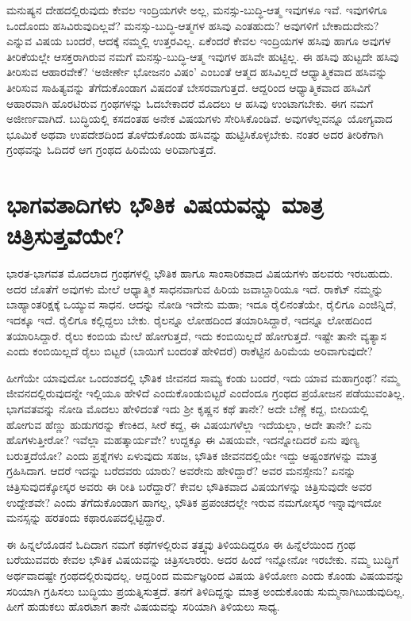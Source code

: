 ಮನುಷ್ಯನ ದೇಹದಲ್ಲಿರುವುದು ಕೇವಲ ಇಂದ್ರಿಯಗಳೇ ಅಲ್ಲ, ಮನಸ್ಸು-ಬುದ್ಧಿ-ಆತ್ಮ ಇವುಗಳೂ ಇವೆ. ಇವುಗಳಿಗೂ ಒಂದೊಂದು ಹಸಿವಿರುವುದಿಲ್ಲವೆ? ಮನಸ್ಸು-ಬುದ್ಧಿ-ಆತ್ಮಗಳ ಹಸಿವು ಎಂತಹುದು? ಅವುಗಳಿಗೆ ಬೇಕಾದುದೇನು? ಎನ್ನುವ ವಿಷಯ ಬಂದರೆ, ಆದಕ್ಕೆ  ನಮ್ಮಲ್ಲಿ ಉತ್ತರವಿಲ್ಲ. ಏಕೆಂದರೆ ಕೇವಲ ಇಂದ್ರಿಯಗಳ ಹಸಿವು ಹಾಗೂ ಅವುಗಳ ತೀರಿಕೆಯಲ್ಲೇ ಆಸಕ್ತರಾಗಿರುವ ನಮಗೆ ಮನಸ್ಸು-ಬುದ್ಧಿ-ಆತ್ಮ ಇವುಗಳ ಹಸಿವೇ ಹುಟ್ಟಿಲ್ಲ. ಈ ಹಸಿವು ಹುಟ್ಟದೇ ಹಸಿವು ತೀರಿಸುವ ಆಹಾರವೇಕೆ? `ಅಜೀರ್ಣೇ ಭೋಜನಂ ವಿಷಂ'\label{265} ಎಂಬಂತೆ ಆತ್ಮದ ಹಸಿವಿಲ್ಲದೆ ಆಧ್ಯಾತ್ಮಿಕವಾದ ಹಸಿವನ್ನು ತೀರಿಸುವ ಸಾಹಿತ್ಯವನ್ನು ತೆಗೆದುಕೊಂಡಾಗ ವಿಷದಂತೆ ಬೇಸರವಾಗುತ್ತದೆ. ಆದ್ದರಿಂದ ಆಧ್ಯಾತ್ಮಿಕವಾದ ಹಸಿವಿಗೆ ಆಹಾರವಾಗಿ ಹೊರಟಿರುವ ಗ್ರಂಥಗಳನ್ನು ಓದಬೇಕಾದರೆ ಮೊದಲು ಆ ಹಸಿವು ಉಂಟಾಗಬೇಕು. ಈಗ ನಮಗೆ ಅಜೀರ್ಣವಾಗಿದೆ. ಬುದ್ಧಿಯಲ್ಲಿ ಕಸದಂತಹ ಅನೇಕ ವಿಷಯಗಳು ಸೇರಿಸಿಕೊಂಡಿವೆ. ಅವುಗಳೆಲ್ಲವನ್ನೂ ಯೋಗ್ಯವಾದ ಭೂಮಿಕೆ ಅಥವಾ ಉಪದೇಶದಿಂದ ತೊಳೆದುಕೊಂಡು ಹಸಿವನ್ನು ಹುಟ್ಟಿಸಿಕೊಳ್ಳಬೇಕು. ನಂತರ ಅದರ ತೀರಿಕೆಗಾಗಿ ಗ್ರಂಥವನ್ನು ಓದಿದರೆ ಆಗ ಗ್ರಂಥದ ಹಿರಿಮೆಯ ಅರಿವಾಗುತ್ತದೆ.

\section*{ಭಾಗವತಾದಿಗಳು ಭೌತಿಕ ವಿಷಯವನ್ನು ಮಾತ್ರ ಚಿತ್ರಿಸುತ್ತವೆಯೇ?}

ಭಾರತ-ಭಾಗವತ ಮೊದಲಾದ ಗ್ರಂಥಗಳಲ್ಲಿ ಭೌತಿಕ ಹಾಗೂ ಸಾಂಸಾರಿಕವಾದ ವಿಷಯಗಳು ಹಲವರು ಇರಬಹುದು. ಅದರ ಜೊತೆಗೆ ಅವುಗಳು ಮೇಲೆ ಆಧ್ಯಾತ್ಮಿಕ ಸಾಧನವಾಗುವ ಹಿರಿಯ ಜವಾಬ್ದಾರಿಯೂ ಇದೆ. ರಾಕೆಟ್ ನಮ್ಮನ್ನು ಬಾಹ್ಯಾಂತರಿಕ್ಷಕ್ಕೆ ಒಯ್ಯುವ ಸಾಧನ. ಆದನ್ನು ನೋಡಿ ಇದೇನು ಮಹಾ; ಇದೂ ರೈಲಿನಂತೆಯೇ, ರೈಲಿಗೂ ಎಂಜಿನ್ನಿದೆ, ಇದಕ್ಕೂ ಇದೆ. ರೈಲಿಗೂ ಕಲ್ಲಿದ್ದಲು ಬೇಕು. ರೈಲನ್ನೂ ಲೋಹದಿಂದ ತಯಾರಿಸಿದ್ದಾರೆ, ಇದನ್ನೂ ಲೋಹದಿಂದ ತಯಾರಿಸಿದ್ದಾರೆ. ರೈಲು ಕಂಬಿಯ ಮೇಲೆ ಹೋಗುತ್ತದೆ, ಇದು ಕಂಬಿಯಿಲ್ಲದೆ ಹೋಗುತ್ತದೆ. ಇಷ್ಟೇ ತಾನೇ ವ್ಯತ್ಯಾಸ ಎಂದು ಕಂಬಿಯಿಲ್ಲದೆ ರೈಲು ಬಿಟ್ಟರೆ (ಬಾಯಿಗೆ ಬಂದಂತೆ ಹೇಳಿದರೆ) ರಾಕೆಟ್ಟಿನ ಹಿರಿಮೆಯ ಅರಿವಾಗುವುದೇ?

ಹೀಗೆಯೇ ಯಾವುದೋ ಒಂದಂಶದಲ್ಲಿ ಭೌತಿಕ ಜೀವನದ ಸಾಮ್ಯ ಕಂಡು ಬಂದರೆ, ಇದು ಯಾವ ಮಹಾಗ್ರಂಥ? ನಮ್ಮ ಜೀವನದಲ್ಲಿರುವುದನ್ನೇ ಇಲ್ಲಿಯೂ ಹೇಳಿದೆ ಎಂದುಕೊಂಡುಬಿಟ್ಟರೆ  ಎಂದೆಂದೂ ಗ್ರಂಥದ ಪ್ರಯೋಜನ ಪಡೆಯುವಂತಿಲ್ಲ. ಭಾಗವತವನ್ನು ನೋಡಿ ಮೊದಲು ಹೇಳಿದಂತೆ ಇದು ಶ್ರೀ ಕೃಷ್ಣನ ಕಥೆ ತಾನೇ? ಅದೇ ಬೆಣ್ಣೆ ಕದ್ದ, ಬೀದಿಯಲ್ಲಿ ಹೋಗುವ ಹೆಣ್ಣು ಹುಡುಗರನ್ನು ಕೆಣಕಿದ, ಸೀರೆ ಕದ್ದ, ಈ ವಿಷಯಗಳೆಲ್ಲಾ ಇದೆಯಲ್ಲಾ, ಅದೇ ತಾನೇ? ಏನು ಹೊಗಳುತ್ತೀರೋ? ಇವೆಲ್ಲಾ ಮಹತ್ಕಾರ್ಯವೇ? ಉದ್ದಕ್ಕೂ ಈ ವಿಷಯವೇ, ಇದನ್ನೋದಿದರೆ ಏನು ಪುಣ್ಯ ಬರುತ್ತದೆಯೋ? ಎಂದು ಪ್ರಶ್ನೆಗಳು ಏಳುವುದು ಸಹಜ, ಭೌತಿಕ ಜೀವನದಲ್ಲಿಯೇ ಇದ್ದು ಅಷ್ಟಂಶಗಳನ್ನು ಮಾತ್ರ ಗ್ರಹಿಸಿದಾಗ. ಆದರೆ ಇದನ್ನು ಬರೆದವರು ಯಾರು? ಅವರೇನು ಹೇಳಿದ್ದಾರೆ? ಅವರ ಮನಸ್ಸೇನು? ಏನನ್ನು ಚಿತ್ರಿಸುವುದಕ್ಕೋಸ್ಕರ ಅವರು ಈ ರೀತಿ ಬರೆದ್ದಾರೆ? ಕೇವಲ ಭೌತಿಕವಾದ ವಿಷಯಗಳನ್ನು ಚಿತ್ರಿಸುವುದೇ ಅವರ ಉದ್ದೇಶವೇ? ಎಂದು ತೆಗೆದುಕೊಂಡಾಗ ಹಾಗಲ್ಲ, ಭೌತಿಕ ಪ್ರಪಂಚದಲ್ಲೇ ಇರುವ ನಮಗೋಸ್ಕರ ಇನ್ನಾವುಇದೋ ಮನಸ್ಸನ್ನು ಹರತಂದು ಕಥಾರೂಪದಲ್ಲಿಟ್ಟಿದ್ದಾರೆ.

ಈ ಹಿನ್ನಲೆಯೊಡನೆ ಓದಿದಾಗ ನಮಗೆ ಕಥೆಗಳಲ್ಲಿರುವ ತತ್ತ್ವವು ತಿಳಿಯದಿದ್ದರೂ ಈ ಹಿನ್ನೆಲೆಯಿಂದ ಗ್ರಂಥ ಬರೆಯುವವರು ಕೇವಲ ಭೌತಿಕ ವಿಷಯವನ್ನು ಚಿತ್ರಿಸಲಾರರು. ಅದರ ಹಿಂದೆ ಇನ್ನೋನೋ ಇರಬೇಕು. ನಮ್ಮ ಬುದ್ಧಿಗೆ ಅರ್ಥವಾದಷ್ಟೇ ಗ್ರಂಥದಲ್ಲಿರುವುದಲ್ಲ. ಆದ್ದರಿಂದ ಮರ್ಮಜ್ಞರಿಂದ ವಿಷಯ ತಿಳಿಯೋಣ ಎಂದು ಕೊಂಡು ವಿಷಯವನ್ನು ಸರಿಯಾಗಿ ಗ್ರಹಿಸಲು ಬುದ್ಧಿಯು ಪ್ರಯತ್ನಿಸುತ್ತದೆ. ತನಗೆ ತಿಳಿದಿದ್ದನ್ನು ಮಾತ್ರ ಅಂದುಕೊಂಡು ಸುಮ್ಮನಾಗಿಬುಡುವುದಿಲ್ಲ. ಹೀಗೆ ಹುಡುಕಲು ಹೊರಟಾಗ ತಾನೇ ವಿಷಯವನ್ನು ಸರಿಯಾಗಿ ತಿಳಿಯಲು ಸಾಧ್ಯ.

